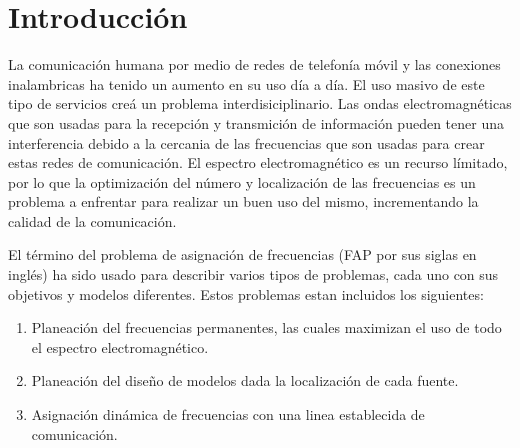 \section{Introducción}

La comunicación humana por medio de redes de telefonía móvil y las conexiones inalambricas ha tenido un aumento en su uso día a día.\cite{Inzaurralde_2014} El uso masivo de este tipo de servicios creá un problema interdisiciplinario. Las ondas electromagnéticas que son usadas para la recepción y transmición de información pueden tener una interferencia debido a la cercania de las frecuencias que son usadas para crear estas redes de comunicación. El espectro electromagnético es un recurso límitado, por lo que la optimización del número y localización de las frecuencias es un problema a enfrentar para realizar un buen uso del mismo, incrementando la calidad de la comunicación.

El término del problema de asignación de frecuencias (FAP por sus siglas en inglés) ha sido usado para describir varios tipos de problemas, cada uno con sus objetivos y modelos diferentes. Estos problemas estan incluidos los siguientes:

\begin{enumerate}
    \item Planeación del frecuencias permanentes, las cuales maximizan el uso de todo el espectro electromagnético.\cite{Zoellner_1973}
    \item Planeación del diseño de modelos dada la localización de cada fuente.
    \item Asignación dinámica de frecuencias con una linea establecida de comunicación.
\end{enumerate}